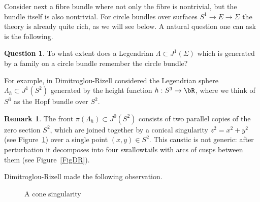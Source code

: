 \documentclass[JEP,XML,SOM,Unicode,NoFloatCountersInSection]{cedram}
\theoremstyle{plain}
\theoremstyle{definition}
\newtheorem{remark}[theorem]{Remark}
\newtheorem{question}[theorem]{Question}
\begin{document}
Consider next a fibre bundle where not only the fibre is nontrivial, but the bundle itself is also nontrivial. For circle bundles over surfaces $S^1 \to E \to \Sigma$ the theory is already quite rich, as we will see below. A natural question one can ask is the following.
\begin{question}\label{Question: remember} To what extent does a Legendrian $\Lambda \subset J^1(\Sigma)$ which is generated by a family on a circle bundle remember the circle bundle?
\end{question}
For example, in \cite{DR11} Dimitroglou-Rizell considered the Legendrian sphere $\Lambda_h \subset J^1(S^2)$ generated by the height function $h:S^3 \to \bR$, where we think of $S^3$ as the Hopf bundle over $S^2$. \begin{remark} The front $\pi(\Lambda_h)\!\subset\!J^0(S^2)$ consists of two parallel copies of the zero section $S^2$, which are joined together by a conical singularity $z^2\!=\!x^2+y^2$ (see Figure~\ref{Fig: cone}) over a single point $(x,y) \in S^2$. This caustic is not generic: after perturbation it decomposes into four swallowtails with arcs of cusps between them (see Figure~\ref{FigDR}).
\end{remark}
Dimitroglou-Rizell made the following observation.

\begin{figure}[htbp]
\begin{center}
\caption{\smaller A cone singularity}
\label{Fig: cone}
\end{center}
\end{figure}
\end{document}
